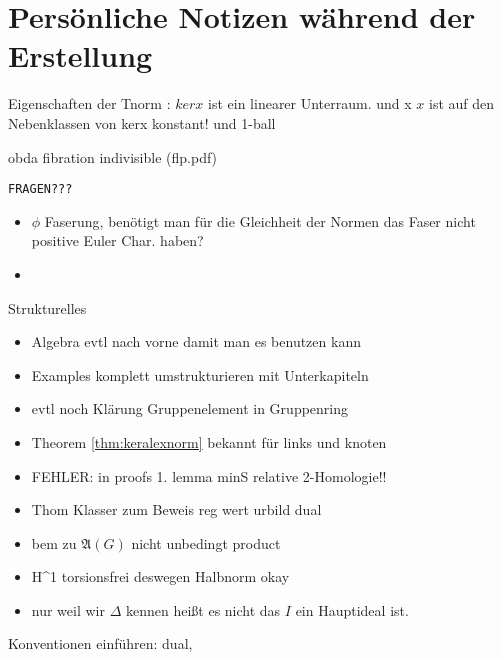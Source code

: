 
\section{Persönliche Notizen während der Erstellung}
	

	Eigenschaften der Tnorm : $kerx$ ist ein linearer Unterraum. und x $x$ ist auf den Nebenklassen von kerx konstant! und 1-ball


	obda fibration indivisible (flp.pdf)

\texttt{FRAGEN???}
	\begin{itemize}
		\item $\phi$ Faserung, benötigt man für die Gleichheit der Normen das Faser nicht positive Euler Char. haben?
		\item 
	\end{itemize}

	{Strukturelles}
	\begin{itemize}
		\item Algebra evtl nach vorne damit man es benutzen kann
		\item Examples komplett umstrukturieren mit Unterkapiteln
		\item evtl noch Klärung Gruppenelement in Gruppenring
		\item Theorem \ref{thm:keralexnorm} bekannt für links und knoten
		\item FEHLER: in proofs 1. lemma minS relative 2-Homologie!!
		\item Thom Klasser zum Beweis reg wert urbild dual
		\item bem zu $\mathfrak A(G)$ nicht unbedingt product
		\item H^1 torsionsfrei deswegen Halbnorm okay
		\item nur weil wir $\Delta$ kennen heißt es nicht das $I$ ein Hauptideal ist.
	\end{itemize}

	Konventionen einführen: dual,

